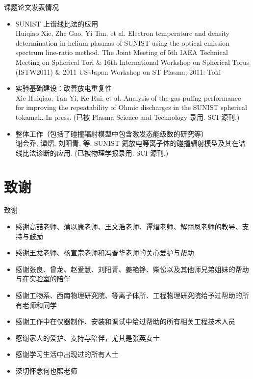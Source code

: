 \begin{CJK*}{UTF8}{kai}
\begin{frame}{课题论文发表情况}
	\small{
	\begin{itemize}
		\item SUNIST 上谱线比法的应用\\
			{\tiny Huiqiao Xie, Zhe Gao, Yi Tan, et al. Electron temperature and density determination in helium plasmas of SUNIST using the optical emission spectrum line-ratio method. The Joint Meeting of 5th IAEA Technical Meeting on Spherical Tori \& 16th International Workshop on Spherical Torus (\alert{ISTW2011}) \& 2011 US-Japan Workshop on ST Plasma, 2011: Toki}
		\item 实验基础建设：改善放电重复性\\
			{\tiny Xie Huiqiao, Tan Yi, Ke Rui, et al. Analysis of the gas puffng performance for improving the repeatability of Ohmic discharges in the SUNIST spherical tokamak. In press. (\alert{已被 Plasma Science and Technology 录用. SCI 源刊.})}
		\item 整体工作（包括了碰撞辐射模型中包含激发态能级数的研究等）\\
			{\tiny 谢会乔, 谭熠, 刘阳青, 等. SUNIST 氦放电等离子体的碰撞辐射模型及其在谱线比法诊断的应用. (\alert{已被物理学报录用. SCI 源刊.})}
	\end{itemize}
	}
\end{frame}

\section{致谢}
\begin{frame}{致谢}
	\begin{itemize}
		\item 感谢高喆老师、蒲以康老师、王文浩老师、谭熠老师、解丽凤老师的教导、支持与鼓励
		\item 感谢王龙老师、杨宣宗老师和冯春华老师的关心爱护与帮助
		\item 感谢张良、曾龙、赵爱慧、刘阳青、姜艳铮、柴忪以及其他师兄弟姐妹的帮助与在实验室的陪伴
		\item 感谢工物系、西南物理研究院、等离子体所、工程物理研究院给予过帮助的所有老师和同学
		\item 感谢工作中在仪器制作、安装和调试中给过帮助的所有相关工程技术人员
		\item 感谢家人的爱护、支持与陪伴，尤其是张英女士
		\item 感谢学习生活中出现过的所有人士
		\item 深切怀念何也熙老师
	\end{itemize}
\end{frame}
\appendix


\end{CJK*}
